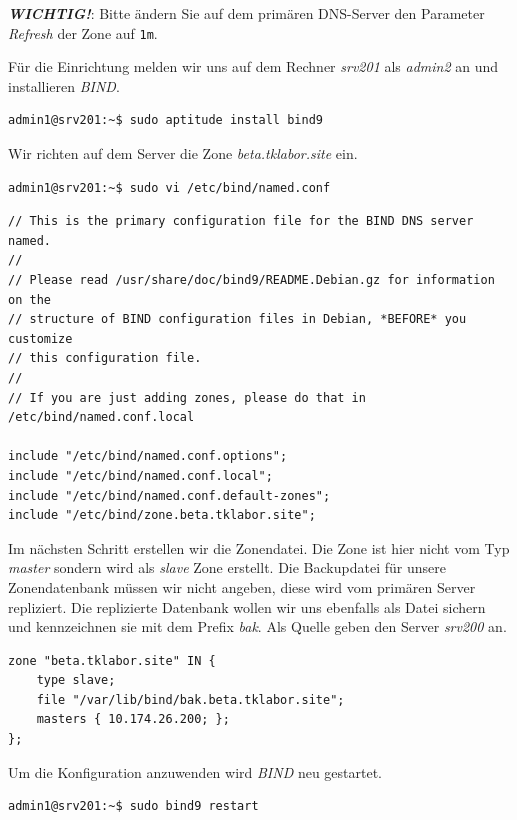 \textbf{\textit{WICHTIG!}}: Bitte ändern Sie auf dem primären DNS-Server den
Parameter \textit{Refresh} der Zone auf \texttt{1m}. 

Für die Einrichtung melden wir uns auf dem Rechner \textit{srv201} als
\textit{admin2} an und installieren \textit{BIND}.

\begin{lstlisting}
admin1@srv201:~$ sudo aptitude install bind9
\end{lstlisting}

Wir richten auf dem Server die Zone \textit{beta.tklabor.site} ein.
\begin{lstlisting}
admin1@srv201:~$ sudo vi /etc/bind/named.conf
\end{lstlisting}
\begin{scriptsize}
\begin{lstlisting}
// This is the primary configuration file for the BIND DNS server named.
//
// Please read /usr/share/doc/bind9/README.Debian.gz for information on the 
// structure of BIND configuration files in Debian, *BEFORE* you customize 
// this configuration file.
//
// If you are just adding zones, please do that in /etc/bind/named.conf.local

include "/etc/bind/named.conf.options";
include "/etc/bind/named.conf.local";
include "/etc/bind/named.conf.default-zones";
include "/etc/bind/zone.beta.tklabor.site";
\end{lstlisting}
\end{scriptsize}

Im nächsten Schritt erstellen wir die Zonendatei. Die Zone ist hier nicht vom
Typ \textit{master} sondern wird als \textit{slave} Zone erstellt. Die
Backupdatei für unsere Zonendatenbank müssen wir nicht angeben, diese wird vom
primären Server repliziert. Die replizierte Datenbank wollen wir uns ebenfalls
als Datei sichern und kennzeichnen sie mit dem Prefix \textit{bak}. Als Quelle
geben den Server \textit{srv200} an.

\begin{scriptsize}
\begin{lstlisting}
zone "beta.tklabor.site" IN {
	type slave;
	file "/var/lib/bind/bak.beta.tklabor.site";
	masters { 10.174.26.200; };
};
\end{lstlisting}
\end{scriptsize}

Um die Konfiguration anzuwenden wird \textit{BIND} neu gestartet.
\begin{lstlisting}
admin1@srv201:~$ sudo bind9 restart
\end{lstlisting}

